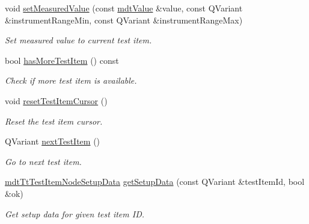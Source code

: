 \begin{DoxyCompactItemize}
void \hyperlink{classmdt_tt_test_a2e33bf83a20e02ed22aa8edd2a1d3f02}{set\-Measured\-Value} (const \hyperlink{classmdt_value}{mdt\-Value} \&value, const Q\-Variant \&instrument\-Range\-Min, const Q\-Variant \&instrument\-Range\-Max)
\begin{DoxyCompactList}\small\item\em Set measured value to current test item. \end{DoxyCompactList}\item 
bool \hyperlink{classmdt_tt_test_a3c130673f9291a7753e691c051c12c2b}{has\-More\-Test\-Item} () const 
\begin{DoxyCompactList}\small\item\em Check if more test item is available. \end{DoxyCompactList}\item 
void \hyperlink{classmdt_tt_test_ae8cafeb9cebf1c11ca136a94ba75020c}{reset\-Test\-Item\-Cursor} ()
\begin{DoxyCompactList}\small\item\em Reset the test item cursor. \end{DoxyCompactList}\item 
Q\-Variant \hyperlink{classmdt_tt_test_aeec72867e84e374f1366e7a9e0c399a8}{next\-Test\-Item} ()
\begin{DoxyCompactList}\small\item\em Go to next test item. \end{DoxyCompactList}\item 
\hyperlink{classmdt_tt_test_item_node_setup_data}{mdt\-Tt\-Test\-Item\-Node\-Setup\-Data} \hyperlink{classmdt_tt_test_adc22aa88e121f46692b41fbde5a61dc1}{get\-Setup\-Data} (const Q\-Variant \&test\-Item\-Id, bool \&ok)
\begin{DoxyCompactList}\small\item\em Get setup data for given test item I\-D. \end{DoxyCompactList}\end{DoxyCompactItemize}
